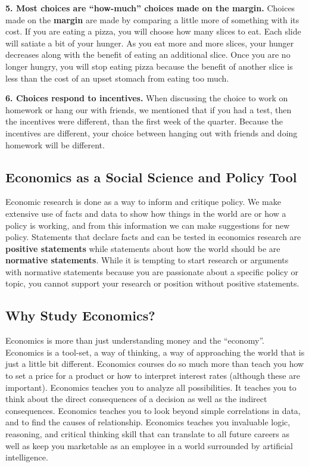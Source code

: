 \documentclass[
]{book}
\begin{document}
\textbf{5. Most choices are ``how-much'' choices made on the margin.}
Choices made on the \textbf{margin} are made by comparing a little more of something with its cost. If you are eating a pizza, you will choose how many slices to eat. Each slide will satiate a bit of your hunger. As you eat more and more slices, your hunger decreases along with the benefit of eating an additional slice. Once you are no longer hungry, you will stop eating pizza because the benefit of another slice is less than the cost of an upset stomach from eating too much.

\textbf{6. Choices respond to incentives.}
When discussing the choice to work on homework or hang our with friends, we mentioned that if you had a test, then the incentives were different, than the first week of the quarter. Because the incentives are different, your choice between hanging out with friends and doing homework will be different.

\subsection{Economics as a Social Science and Policy Tool}\label{economics-as-a-social-science-and-policy-tool}

Economic research is done as a way to inform and critique policy. We make extensive use of facts and data to show how things in the world are or how a policy is working, and from this information we can make suggestions for new policy. Statements that declare facts and can be tested in economics research are \textbf{positive statements} while statements about how the world should be are \textbf{normative statements}. While it is tempting to start research or arguments with normative statements because you are passionate about a specific policy or topic, you cannot support your research or position without positive statements.

\subsection{Why Study Economics?}\label{why-study-economics}

Economics is more than just understanding money and the ``economy''. Economics is a tool-set, a way of thinking, a way of approaching the world that is just a little bit different. Economics courses do so much more than teach you how to set a price for a product or how to interpret interest rates (although these are important). Economics teaches you to analyze all possibilities. It teaches you to think about the direct consequences of a decision as well as the indirect consequences. Economics teaches you to look beyond simple correlations in data, and to find the causes of relationship. Economics teaches you invaluable logic, reasoning, and critical thinking skill that can translate to all future careers as well as keep you marketable as an employee in a world surrounded by artificial intelligence.
\end{document}
